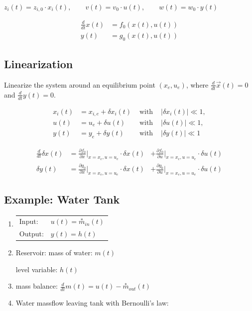 \documentclass[10pt,a4paper]{scrartcl}
\begin{document}
\begin{multicols*}{3}
	$z_i(t)=z_{i,0}\cdot x_i(t),\qquad v(t)=v_0\cdot u(t),\qquad w(t)=w_0\cdot y(t)$
	
	\begin{align*}
	\frac{d}{dt}x(t)&=f_0(x(t),u(t))\\
	y(t)&=g_0(x(t),u(t))
	\end{align*}
	
\vfill
\null
\columnbreak

\subsection{Linearization}
	
Linearize the system around an equilibrium point $(x_e,u_e)$, where $\frac{d}{dt}\vec{x}(t)=0$ and $\frac{d}{dt}y(t)=0$.
	
\begin{alignat*}{4}
x_i(t)&=x_{i,e}+\delta x_i(t)&\text{ with  }&|\delta x_i(t)|\ll 1,\\
u(t)&=u_e+\delta u(t)&\text{ with  }&|\delta u(t)|\ll 1,\\
y(t)&=y_e+\delta y(t)&\text{ with  } &|\delta y(t)|\ll 1
\end{alignat*}
	
\begin{alignat*}{3}
\frac{d}{dt}\delta x(t) &= \frac{\partial f_0}{\partial x}|_{x=x_e,u=u_e}\cdot \delta x(t)&+\frac{\partial f_0}{\partial u}|_{x=x_e,u=u_e}\cdot \delta u(t)\\
\delta y(t)&=\frac{\partial g_0}{\partial x}|_{x=x_e,u=u_e}\cdot\delta x(t) &+\frac{\partial g_0}{\partial u}|_{x=x_e,u=u_e}\cdot\delta u(t)
\end{alignat*}
	
	
\subsection{Example: Water Tank}


\begin{enumerate}
\item \begin{tabular}{ll}Input:&$u(t)=\overset{\ast}{m}_{in}(t)$\\Output:&$y(t)=h(t)$\end{tabular}
\item Reservoir: mass of water: $m(t)$

level variable: $h(t)$
\item mass balance: $\frac{d}{dt}m(t)=u(t)-\overset{\ast}{m}_{out}(t)$
\item Water massflow leaving tank with Bernoulli's law:


\end{enumerate}
\end{multicols*}
\end{document}
